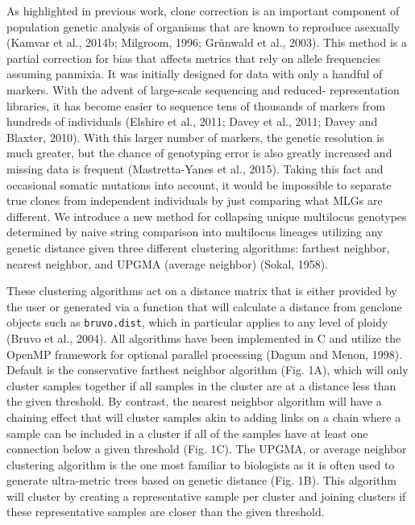 \documentclass{frontiersSCNS} %
\begin{document}
As highlighted in previous work, clone correction is an important
component of population genetic analysis of organisms that are known to
reproduce asexually (Kamvar et al., 2014b; Milgroom, 1996; Gr\"{u}nwald et
al., 2003). This method is a partial correction for bias that affects
metrics that rely on allele frequencies assuming panmixia. It was
initially designed for data with only a handful of markers. With the
advent of large-scale sequencing and reduced- representation libraries,
it has become easier to sequence tens of thousands of markers from
hundreds of individuals (Elshire et al., 2011; Davey et al., 2011; Davey
and Blaxter, 2010). With this larger number of markers, the genetic
resolution is much greater, but the chance of genotyping error is also
greatly increased and missing data is frequent (Mastretta-Yanes et al.,
2015). Taking this fact and occasional somatic mutations into account,
it would be impossible to separate true clones from independent
individuals by just comparing what MLGs are different. We introduce a
new method for collapsing unique multilocus genotypes determined by
naive string comparison into multilocus lineages utilizing any genetic
distance given three different clustering algorithms: farthest neighbor,
nearest neighbor, and UPGMA (average neighbor) (Sokal, 1958).

These clustering algorithms act on a distance matrix that is either
provided by the user or generated via a function that will calculate a
distance from genclone objects such as \texttt{bruvo.dist}, which in
particular applies to any level of ploidy (Bruvo et al., 2004). All
algorithms have been implemented in C and utilize the OpenMP framework
for optional parallel processing (Dagum and Menon, 1998). Default is the
conservative farthest neighbor algorithm (Fig. 1A), which will only
cluster samples together if all samples in the cluster are at a distance
less than the given threshold. By contrast, the nearest neighbor
algorithm will have a chaining effect that will cluster samples akin to
adding links on a chain where a sample can be included in a cluster if
all of the samples have at least one connection below a given threshold
(Fig. 1C). The UPGMA, or average neighbor clustering algorithm is the
one most familiar to biologists as it is often used to generate
ultra-metric trees based on genetic distance (Fig. 1B). This algorithm
will cluster by creating a representative sample per cluster and joining
clusters if these representative samples are closer than the given
threshold.
\end{document}
